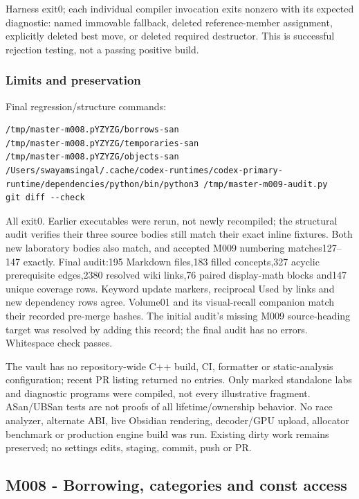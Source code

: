 Harness exit0; each individual compiler invocation exits nonzero with its expected diagnostic: named immovable fallback, deleted reference-member assignment, explicitly deleted best move, or deleted required destructor. This is successful rejection testing, not a passing positive build.

\subsubsection{Limits and preservation}\label{appendix-a103e7846d21-limits-and-preservation}

Final regression/structure commands:

\begin{verbatim}
/tmp/master-m008.pYZYZG/borrows-san
/tmp/master-m008.pYZYZG/temporaries-san
/tmp/master-m008.pYZYZG/objects-san
/Users/swayamsingal/.cache/codex-runtimes/codex-primary-runtime/dependencies/python/bin/python3 /tmp/master-m009-audit.py
git diff --check
\end{verbatim}

All exit0. Earlier executables were rerun, not newly recompiled; the structural audit verifies their three source bodies still match their exact inline fixtures. Both new laboratory bodies also match, and accepted M009 numbering matches127--147 exactly. Final audit:195 Markdown files,183 filled concepts,327 acyclic prerequisite edges,2380 resolved wiki links,76 paired display-math blocks and147 unique coverage rows. Keyword update markers, reciprocal Used by links and new dependency rows agree. Volume01 and its visual-recall companion match their recorded pre-merge hashes. The initial audit's missing M009 source-heading target was resolved by adding this record; the final audit has no errors. Whitespace check passes.

The vault has no repository-wide C++ build, CI, formatter or static-analysis configuration; recent PR listing returned no entries. Only marked standalone labs and diagnostic programs were compiled, not every illustrative fragment. ASan/UBSan tests are not proofs of all lifetime/ownership behavior. No race analyzer, alternate ABI, live Obsidian rendering, decoder/GPU upload, allocator benchmark or production engine build was run. Existing dirty work remains preserved; no settings edits, staging, commit, push or PR.

\subsection{M008 - Borrowing, categories and const access}\label{appendix-a103e7846d21-m008---borrowing-categories-and-const-access}

